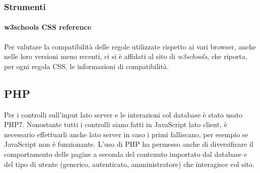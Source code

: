\subsubsection{Strumenti}
\label{implementazione-css-strumenti}

\paragraph{w3schools CSS reference}
\label{implementazione-css-strumenti-w3schools-reference}
Per valutare la compatibilità delle regole utilizzate rispetto ai vari browser, anche nelle loro versioni meno recenti, ci si è affidati al sito di \textit{w3schools}, che riporta, per ogni regola CSS, le informazioni di compatibilità.

\subsection{PHP}
\label{implementazione-php}
Per i controlli sull'input lato server e le interazioni col database è stato usato PHP7. Nonostante tutti i controlli siano fatti in JavaScript lato client, è necessario effettuarli anche lato server in caso i primi falliscano, per esempio se JavaScript non è funzionante. L'uso di PHP ha permesso anche di diversificare il comportamento delle pagine a seconda del contenuto importato dal database e del tipo di utente (generico, autenticato, amministratore) che interagisce col sito.

